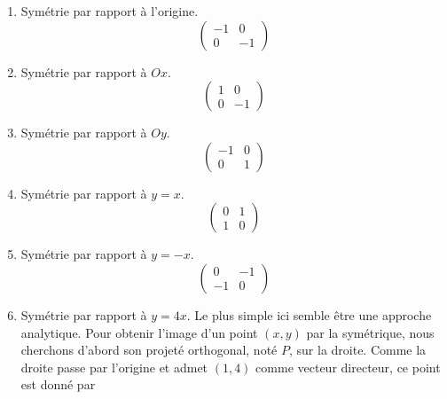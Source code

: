 \documentclass[12pt,french,oneside,a4paper]{memoir} %
\begin{document}
\begin{exo}
\begin{correction}
\begin{enumerate}
  \item Symétrie par rapport à l'origine.
    \begin{equation*}
      \begin{pmatrix}
        -1 & 0\\ 0 &-1
      \end{pmatrix}
    \end{equation*}

  \item Symétrie par rapport à $Ox$.
    \begin{equation*}
      \begin{pmatrix}
        1 & 0\\ 0 & -1
      \end{pmatrix}
    \end{equation*}

  \item Symétrie par rapport à $Oy$.
    \begin{equation*}
      \begin{pmatrix}
        -1 & 0\\ 0 & 1
      \end{pmatrix}
    \end{equation*}
  \item Symétrie par rapport à $y=x$.
    \begin{equation*}
      \begin{pmatrix}
        0 & 1\\ 1 & 0
      \end{pmatrix}
    \end{equation*}
  \item Symétrie par rapport à $y=-x$.
    \begin{equation*}
      \begin{pmatrix}
        0 & -1\\ -1 & 0
      \end{pmatrix}
    \end{equation*}
  \item Symétrie par rapport à $y=4x$. %
    Le plus simple ici semble être une approche analytique. Pour obtenir l'image d'un point $(x,y)$ par la symétrique, nous cherchons d'abord son projeté orthogonal, noté $P$, sur la droite. Comme la droite passe par l'origine et admet $(1,4)$ comme vecteur directeur, ce point est donné par

\end{enumerate}
\end{correction}
\end{exo}
\end{document}

